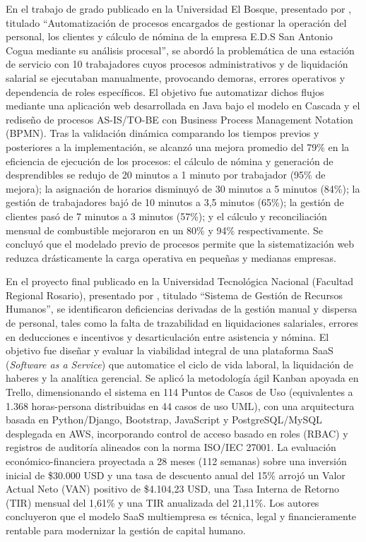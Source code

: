 En el trabajo de grado publicado en la Universidad El Bosque, presentado por \textcite{beltran2021automatizacion}, 
titulado ``Automatización de procesos encargados de gestionar la operación del personal, los clientes y cálculo de nómina de la 
empresa E.D.S San Antonio Cogua mediante su análisis procesal'', se abordó la problemática de una estación de servicio 
con 10 trabajadores cuyos procesos administrativos y de liquidación salarial se ejecutaban manualmente,
provocando demoras, errores operativos y dependencia de roles específicos.
El objetivo fue automatizar dichos flujos mediante una aplicación web desarrollada en Java bajo el modelo en Cascada 
y el rediseño de procesos AS-IS/TO-BE con Business Process Management Notation (BPMN). 
Tras la validación dinámica comparando los tiempos previos y posteriores a la implementación, 
se alcanzó una mejora promedio del 79\% en la eficiencia de ejecución de los procesos: el cálculo de nómina y 
generación de desprendibles se redujo de 20 minutos a 1 minuto por trabajador (95\% de mejora); 
la asignación de horarios disminuyó de 30 minutos a 5 minutos (84\%); la gestión de trabajadores bajó de 10 minutos 
a 3,5 minutos (65\%); la gestión de clientes pasó de 7 minutos a 3 minutos (57\%); y el cálculo y 
reconciliación mensual de combustible mejoraron en un 80\% y 94\% respectivamente. Se concluyó que el 
modelado previo de procesos permite que la sistematización web reduzca drásticamente la carga operativa en pequeñas y medianas empresas.

En el proyecto final publicado en la Universidad Tecnológica Nacional (Facultad Regional Rosario), presentado por \textcite{basualdo2026sistema}, 
titulado ``Sistema de Gestión de Recursos Humanos'', se identificaron deficiencias derivadas de la gestión manual y dispersa de personal, 
tales como la falta de trazabilidad en liquidaciones salariales, errores en deducciones e incentivos y desarticulación entre asistencia y nómina. 
El objetivo fue diseñar y evaluar la viabilidad integral de una plataforma SaaS (\textit{Software as a Service}) que automatice el ciclo de vida laboral,
la liquidación de haberes y la analítica gerencial. Se aplicó la metodología ágil Kanban apoyada en Trello, 
dimensionando el sistema en 114 Puntos de Casos de Uso (equivalentes a 1.368 horas-persona distribuidas en 44 casos de uso UML), 
con una arquitectura basada en Python/Django, Bootstrap, JavaScript y PostgreSQL/MySQL desplegada en AWS, 
incorporando control de acceso basado en roles (RBAC) y registros de auditoría alineados con la norma ISO/IEC 27001. 
La evaluación económico-financiera proyectada a 28 meses (112 semanas) sobre una inversión inicial de \$30.000 USD y 
una tasa de descuento anual del 15\% arrojó un Valor Actual Neto (VAN) positivo de \$4.104,23 USD, 
una Tasa Interna de Retorno (TIR) mensual del 1,61\% y una TIR anualizada del 21,11\%. Los autores concluyeron 
que el modelo SaaS multiempresa es técnica, legal y financieramente rentable para modernizar la gestión de capital humano.



